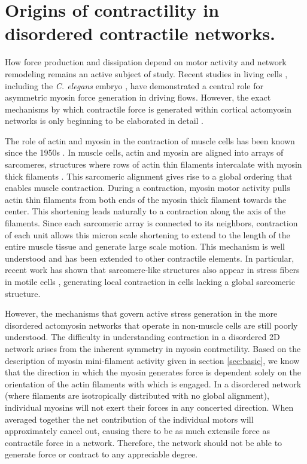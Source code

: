 \section{Origins of contractility in disordered contractile networks.}

How force production and dissipation depend on motor activity and network remodeling remains an active subject of study.  Recent studies in living cells \cite{Hawkins20111041,amoeba4}, including the \textit{C. elegans} embryo \cite{cellmech_flows}, have demonstrated a central role for asymmetric myosin force generation in driving flows. However, the exact mechanisms by which contractile force is generated within cortical actomyosin networks is only beginning to be elaborated in detail  \cite{PhysRevX.4.041002}.  

The role of actin and myosin in the contraction of muscle cells has been known since the 1950s \cite{HUXLEY1954}.  In muscle cells, actin and myosin are aligned into arrays of sarcomeres, structures where rows of actin thin filaments intercalate with myosin thick filaments \cite{Iwazumi1989}.  This sarcomeric alignment gives rise to a global ordering that enables muscle contraction. During a contraction, myosin motor activity pulls actin thin filaments from both ends of the myosin thick filament towards the center. This shortening leads naturally to a contraction along the axis of the filaments. Since each sarcomeric array is connected to its neighbors, contraction of each unit allows this micron scale shortening to extend to the length of the entire muscle tissue and generate large scale motion.  This mechanism is well understood and has been extended to other contractile elements.  In particular, recent work has shown that sarcomere-like structures also appear in stress fibers in motile cells \cite{Kassianidou20153065}, generating local contraction in cells lacking a global sarcomeric structure. 

However, the mechanisms that govern active stress generation in the more disordered actomyosin networks that operate in non-muscle cells are still poorly understood. The difficulty in understanding contraction in a disordered 2D network arises from the inherent symmetry in myosin contractility.  Based on the description of myosin mini-filament activity given in section \ref{sec:basic}, we know that the direction in which the myosin generates force is dependent solely on the orientation of the actin filaments with which is engaged.  In a disordered network (where filaments are isotropically distributed with no global alignment), individual myosins will not exert their forces in any concerted direction. When averaged together the net contribution of the individual motors will approximately cancel out, causing there to be as much extensile force as contractile force in a network.  Therefore, the network should not be able to generate force or contract to any appreciable degree.

